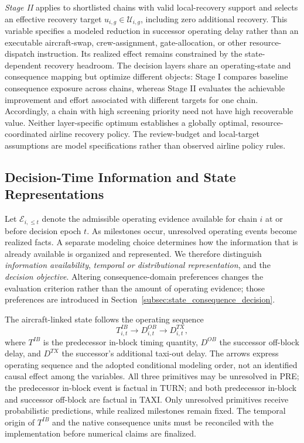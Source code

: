 \emph{Stage II} applies to shortlisted chains with valid local-recovery support and selects an effective recovery target $u_{i,g}\in\mathcal U_{i,g}$, including zero additional recovery. This variable specifies a modeled reduction in successor operating delay rather than an executable aircraft-swap, crew-assignment, gate-allocation, or other resource-dispatch instruction. Its realized effect remains constrained by the state-dependent recovery headroom. The decision layers share an operating-state and consequence mapping but optimize different objects: Stage I compares baseline consequence exposure across chains, whereas Stage II evaluates the achievable improvement and effort associated with different targets for one chain. Accordingly, a chain with high screening priority need not have high recoverable value. Neither layer-specific optimum establishes a globally optimal, resource-coordinated airline recovery policy. The review-budget and local-target assumptions are model specifications rather than observed airline policy rules.

\subsection{Decision-Time Information and State Representations}
\label{subsec:state_representation}

Let $\mathcal E_{i,\leq t}$ denote the admissible operating evidence available for chain $i$ at or before decision epoch $t$. As milestones occur, unresolved operating events become realized facts. A separate modeling choice determines how the information that is already available is organized and represented. We therefore distinguish \emph{information availability}, \emph{temporal or distributional representation}, and the \emph{decision objective}. Altering consequence-domain preferences changes the evaluation criterion rather than the amount of operating evidence; those preferences are introduced in Section~\ref{subsec:state_consequence_decision}.

The aircraft-linked state follows the operating sequence
\[
T^{IB}_{i,t}\longrightarrow D^{OB}_{i,t}\longrightarrow D^{TX}_{i,t},
\]
where $T^{IB}$ is the predecessor in-block timing quantity, $D^{OB}$ the successor off-block delay, and $D^{TX}$ the successor's additional taxi-out delay. The arrows express operating sequence and the adopted conditional modeling order, not an identified causal effect among the variables. All three primitives may be unresolved in PRE; the predecessor in-block event is factual in TURN; and both predecessor in-block and successor off-block are factual in TAXI. Only unresolved primitives receive probabilistic predictions, while realized milestones remain fixed. The temporal origin of $T^{IB}$ and the native consequence units must be reconciled with the implementation before numerical claims are finalized.


